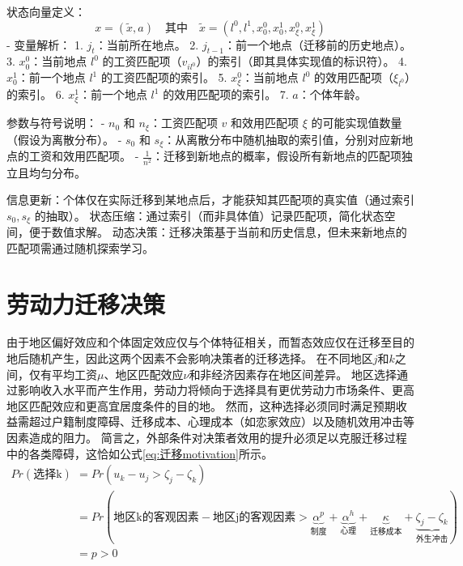 \documentclass[a4paper,12pt,oneside, fontset=mac]{ctexbook} %
\begin{document}
状态向量定义：
\[ x = (\tilde{x}, a) \quad \text{其中} \quad \tilde{x} = (l^0, l^1, x_0^0, x_0^1, x_\xi^0, x_\xi^1) \]
- 变量解析：
  1. $j_t$：当前所在地点。
  2. $j_{t-1}$：前一个地点（迁移前的历史地点）。
  3. $x_0^0$：当前地点 $l^0$ 的工资匹配项（$v_{il^0}$）的索引（即其具体实现值的标识符）。
  4. $x_0^1$：前一个地点 $l^1$ 的工资匹配项的索引。
  5. $x_\xi^0$：当前地点 $l^0$ 的效用匹配项（$\xi_{l^0}$）的索引。
  6. $x_\xi^1$：前一个地点 $l^1$ 的效用匹配项的索引。
  7. $a$：个体年龄。

参数与符号说明：
- $n_0$ 和 $n_\xi$：工资匹配项 $v$ 和效用匹配项 $\xi$ 的可能实现值数量（假设为离散分布）。
- $s_0$ 和 $s_\xi$：从离散分布中随机抽取的索引值，分别对应新地点的工资和效用匹配项。
- $\frac{1}{n^2}$：迁移到新地点的概率，假设所有新地点的匹配项独立且均匀分布。

信息更新：个体仅在实际迁移到某地点后，才能获知其匹配项的真实值（通过索引 $s_0, s_\xi$ 的抽取）。
状态压缩：通过索引（而非具体值）记录匹配项，简化状态空间，便于数值求解。
动态决策：迁移决策基于当前和历史信息，但未来新地点的匹配项需通过随机探索学习。







\section{劳动力迁移决策}

由于地区偏好效应和个体固定效应仅与个体特征相关，而暂态效应仅在迁移至目的地后随机产生，因此这两个因素不会影响决策者的迁移选择。
在不同地区$j$和$k$之间，仅有平均工资$\mu$、地区匹配效应$\nu$和非经济因素存在地区间差异。
地区选择通过影响收入水平而产生作用，劳动力将倾向于选择具有更优劳动力市场条件、更高地区匹配效应和更高宜居度条件的目的地。
然而，这种选择必须同时满足预期收益需超过户籍制度障碍、迁移成本、心理成本（如恋家效应）以及随机效用冲击等因素造成的阻力。
简言之，外部条件对决策者效用的提升必须足以克服迁移过程中的各类障碍，这恰如公式\ref{eq:迁移motivation}所示。
\begin{equation}
\begin{split}
  Pr(\text{选择k})&= Pr(u_k - u_j > \zeta_j - \zeta_k) 
  \\&= Pr(
  \text{地区k的客观因素} - \text{地区j的客观因素} 
  > 
  \underbrace{\alpha^p}_{\text{制度}} + \underbrace{\alpha^h}_{\text{心理}} + \underbrace{\kappa}_{\text{迁移成本}} + \underbrace{
  \zeta_j - \zeta_k}_{\text{外生冲击}} 
  )
  \\&= p >0
\end{split}
\label{eq:迁移motivation}
\end{equation}
\end{document}

